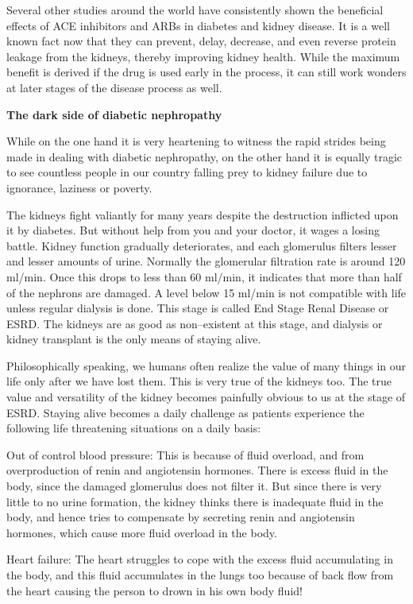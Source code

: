 {Several other studies around the world have consistently shown the beneficial effects of ACE inhibitors and ARBs in diabetes and kidney disease. It is a well known fact now that they can prevent, delay, decrease, and even reverse protein leakage from the kidneys, thereby improving kidney health. While the maximum benefit is derived if the drug is used early in the process, it can still work wonders at later stages of the disease process as well.

\textbf{The dark side of diabetic nephropathy}

While on the one hand it is very heartening to witness the rapid strides being made in dealing with diabetic nephropathy, on the other hand it is equally tragic to see countless people in our country falling prey to kidney failure due to ignorance, laziness or poverty.

The kidneys fight valiantly for many years despite the destruction inflicted upon it by diabetes. But without help from you and your doctor, it wages a losing battle. Kidney function gradually deteriorates, and each glomerulus filters lesser and lesser amounts of urine. Normally the glomerular filtration rate is around 120 ml/min. Once this drops to less than 60 ml/min, it indicates that more than half of the nephrons are damaged. A level below 15 ml/min is not compatible with life unless regular dialysis is done. This stage is called End Stage Renal Disease or ESRD. The kidneys are as good as non–existent at this stage, and dialysis or kidney transplant is the only means of staying alive.

Philosophically speaking, we humans often realize the value of many things in our life only after we have lost them. This is very true of the kidneys too. The true value and versatility of the kidney becomes painfully obvious to us at the stage of ESRD. Staying alive becomes a daily challenge as patients experience the following life threatening situations on a daily basis:

\item Out of control blood pressure: This is because of fluid overload, and from overproduction of renin and angiotensin hormones. There is excess fluid in the body, since the damaged glomerulus does not filter it. But since there is very little to no urine formation, the kidney thinks there is inadequate fluid in the body, and hence tries to compensate by secreting renin and angiotensin hormones, which cause more fluid overload in the body.

 \item Heart failure: The heart struggles to cope with the excess fluid accumulating in the body, and this fluid accumulates in the lungs too because of back flow from the heart causing the person to drown in his own body fluid!

}
